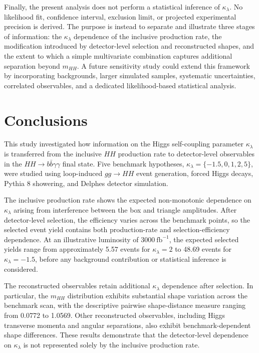 \documentclass[11pt,a4paper]{article}
\begin{document}
Finally, the present analysis does not perform a statistical inference of $\kappa_\lambda$. No likelihood fit, confidence interval, exclusion limit, or projected experimental precision is derived. The purpose is instead to separate and illustrate three stages of information: the $\kappa_\lambda$ dependence of the inclusive production rate, the modification introduced by detector-level selection and reconstructed shapes, and the extent to which a simple multivariate combination captures additional separation beyond $m_{HH}$. A future sensitivity study could extend this framework by incorporating backgrounds, larger simulated samples, systematic uncertainties, correlated observables, and a dedicated likelihood-based statistical analysis.

\section{Conclusions}

This study investigated how information on the Higgs self-coupling parameter $\kappa_\lambda$ is transferred from the inclusive $HH$ production rate to detector-level observables in the $HH\to b\bar b\gamma\gamma$ final state. Five benchmark hypotheses, $\kappa_\lambda=\{-1.5,0,1,2,5\}$, were studied using loop-induced $gg\to HH$ event generation, forced Higgs decays, Pythia 8 showering, and Delphes detector simulation.

The inclusive production rate shows the expected non-monotonic dependence on $\kappa_\lambda$ arising from interference between the box and triangle amplitudes. After detector-level selection, the efficiency varies across the benchmark points, so the selected event yield contains both production-rate and selection-efficiency dependence. At an illustrative luminosity of $3000~\mathrm{fb}^{-1}$, the expected selected yields range from approximately 5.57 events for $\kappa_\lambda=2$ to 48.69 events for $\kappa_\lambda=-1.5$, before any background contribution or statistical inference is considered.

The reconstructed observables retain additional $\kappa_\lambda$ dependence after selection. In particular, the $m_{HH}$ distribution exhibits substantial shape variation across the benchmark scan, with the descriptive pairwise shape-distance measure ranging from 0.0772 to 1.0569. Other reconstructed observables, including Higgs transverse momenta and angular separations, also exhibit benchmark-dependent shape differences. These results demonstrate that the detector-level dependence on $\kappa_\lambda$ is not represented solely by the inclusive production rate.
\end{document}
